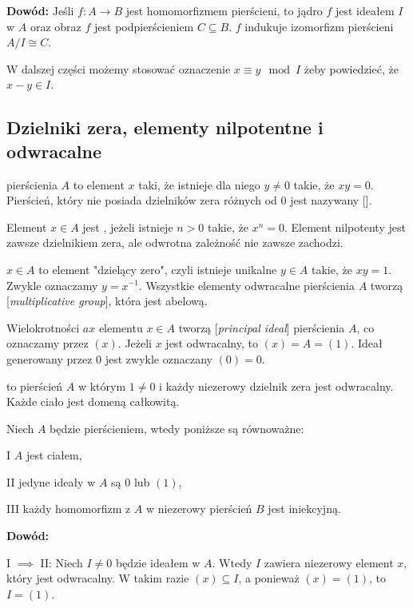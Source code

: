 \textbf{Dowód:} Jeśli $f:A\to B$ jest homomorfizmem pierścieni, to jądro $f$ jest ideałem $I$ w $A$ oraz obraz $f$ jest podpierścieniem $C\subseteq B$. $f$ indukuje izomorfizm pierścieni $A/I\cong C$.

\proofend

W dalszej części możemy stosować oznaczenie $x\equiv y\mod I$ żeby powiedzieć, że $x-y\in I$.

\subsection{Dzielniki zera, elementy nilpotentne i odwracalne}

 pierścienia $A$ to element $x$ taki, że istnieje dla niego $y\neq 0$ takie, że $xy=0$. Pierścień, który nie posiada dzielników zera różnych od $0$ jest nazywany  []. 

Element $x\in A$ jest , jeżeli istnieje $n>0$ takie, że $x^n=0$. Element nilpotenty jest zawsze dzielnikiem zera, ale odwrotna zależność nie zawsze zachodzi. 

 $x\in A$ to element "dzielący zero", czyli istnieje unikalne $y\in A$ takie, że $xy=1$. Zwykle oznaczamy $y=x^{-1}$. Wszystkie elementy odwracalne pierścienia $A$ tworzą  [\emph{multiplicative group}], która jest abelową.
\smallskip

Wielokrotności $ax$ elementu $x\in A$ tworzą  [\emph{principal ideal}] pierścienia $A$, co oznaczamy przez $(x)$. Jeżeli $x$ jest odwracalny, to $(x)=A=(1)$. Ideał generowany przez $0$ jest zwykle oznaczany $(0)=0$.

 to pierścień $A$ w którym $1\neq0$ i każdy niezerowy dzielnik zera jest odwracalny. Każde ciało jest domeną całkowitą.
\smallskip

 Niech $A$ będzie pierścieniem, wtedy poniższe są równoważne:

\indent I $A$ jest ciałem,

\indent II jedyne ideały w $A$ są $0$ lub $(1)$,

\indent III każdy homomorfizm z $A$ w niezerowy pierścień $B$ jest iniekcyjną.

\textbf{Dowód:} 

I $\implies$ II: Niech $I\neq 0$ będzie ideałem w $A$. Wtedy $I$ zawiera niezerowy element $x$, który jest odwracalny. W takim razie $(x)\subseteq I$, a ponieważ $(x)=(1)$, to $I=(1)$. 


